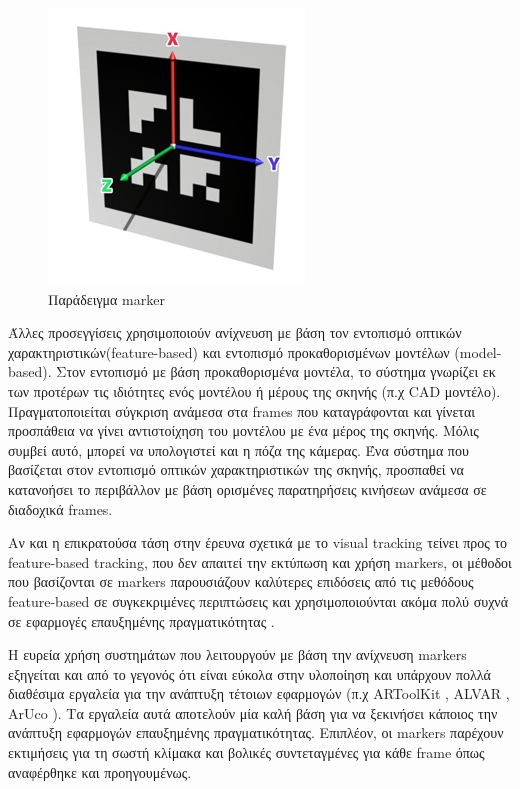 \begin{figure}[H]
    \centering
    \includegraphics[scale=0.55, angle=0]{Files/Figures/marker-axis.jpg}
    \caption[Παράδειγμα marker]{ Παράδειγμα marker}
    \label{fig:marker}
\end{figure}




Άλλες προσεγγίσεις χρησιμοποιούν ανίχνευση με βάση τον εντοπισμό οπτικών χαρακτηριστικών(feature-based) και εντοπισμό προκαθορισμένων μοντέλων (model-based). Στον εντοπισμό με βάση προκαθορισμένα μοντέλα, το σύστημα γνωρίζει εκ των προτέρων τις ιδιότητες ενός μοντέλου ή μέρους της σκηνής (π.χ CAD μοντέλο). Πραγματοποιείται σύγκριση ανάμεσα στα frames που καταγράφονται και γίνεται προσπάθεια να γίνει αντιστοίχηση του μοντέλου με ένα μέρος της σκηνής. Μόλις συμβεί αυτό, μπορεί να υπολογιστεί και η πόζα της κάμερας. Ένα σύστημα που βασίζεται στον εντοπισμό οπτικών χαρακτηριστικών της σκηνής, προσπαθεί να κατανοήσει το περιβάλλον με βάση ορισμένες παρατηρήσεις κινήσεων ανάμεσα σε διαδοχικά frames. 


Αν και η επικρατούσα τάση στην έρευνα σχετικά με το visual tracking τείνει προς το feature-based tracking, που δεν απαιτεί την εκτύπωση και χρήση markers, οι μέθοδοι που βασίζονται σε markers παρουσιάζουν καλύτερες επιδόσεις από τις μεθόδους feature-based σε συγκεκριμένες περιπτώσεις και χρησιμοποιούνται ακόμα πολύ συχνά σε εφαρμογές επαυξημένης πραγματικότητας \cite{wagner2008robust} \cite{rabbi2014applications} .


Η ευρεία χρήση συστημάτων που λειτουργούν με βάση την ανίχνευση markers εξηγείται και από το γεγονός ότι είναι εύκολα στην υλοποίηση και υπάρχουν πολλά διαθέσιμα εργαλεία για την ανάπτυξη τέτοιων εφαρμογών (π.χ ARToolKit \cite{artoolkit}, ALVAR \cite{alvar}, ArUco \cite{aruco}). Τα εργαλεία αυτά αποτελούν μία καλή βάση για να ξεκινήσει κάποιος την ανάπτυξη εφαρμογών επαυξημένης πραγματικότητας. Επιπλέον, οι markers παρέχουν εκτιμήσεις για τη σωστή κλίμακα και βολικές συντεταγμένες για κάθε frame όπως αναφέρθηκε και προηγουμένως. 



